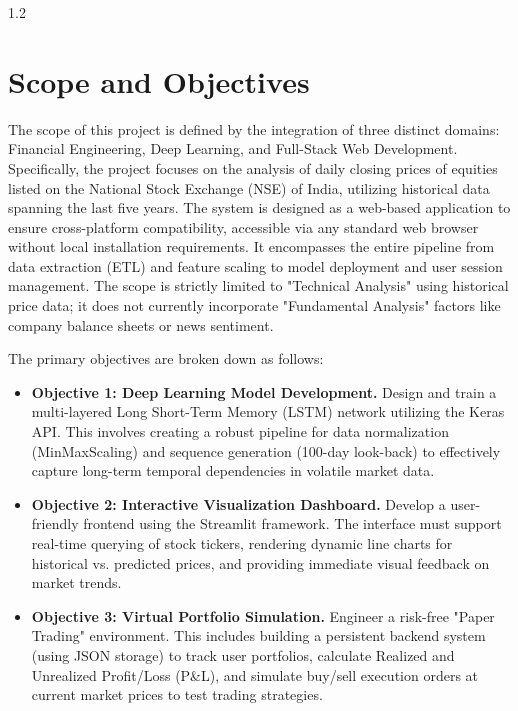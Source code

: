 \documentclass[12pt, a4paper]{report}
\begin{document}
\begin{spacing}{1.2}
\section{Scope and Objectives} The scope of this project is defined by the integration of three distinct domains: Financial Engineering, Deep Learning, and Full-Stack Web Development. Specifically, the project focuses on the analysis of daily closing prices of equities listed on the National Stock Exchange (NSE) of India, utilizing historical data spanning the last five years. The system is designed as a web-based application to ensure cross-platform compatibility, accessible via any standard web browser without local installation requirements. It encompasses the entire pipeline from data extraction (ETL) and feature scaling to model deployment and user session management. The scope is strictly limited to "Technical Analysis" using historical price data; it does not currently incorporate "Fundamental Analysis" factors like company balance sheets or news sentiment.

The primary objectives are broken down as follows: \begin{itemize} \item \textbf{Objective 1: Deep Learning Model Development.} Design and train a multi-layered Long Short-Term Memory (LSTM) network utilizing the Keras API. This involves creating a robust pipeline for data normalization (MinMaxScaling) and sequence generation (100-day look-back) to effectively capture long-term temporal dependencies in volatile market data.

\item \textbf{Objective 2: Interactive Visualization Dashboard.} Develop a user-friendly frontend using the Streamlit framework. The interface must support real-time querying of stock tickers, rendering dynamic line charts for historical vs. predicted prices, and providing immediate visual feedback on market trends.

\item \textbf{Objective 3: Virtual Portfolio Simulation.} Engineer a risk-free "Paper Trading" environment. This includes building a persistent backend system (using JSON storage) to track user portfolios, calculate Realized and Unrealized Profit/Loss (P\&L), and simulate buy/sell execution orders at current market prices to test trading strategies.


\end{itemize}
\end{spacing}
\end{document}
